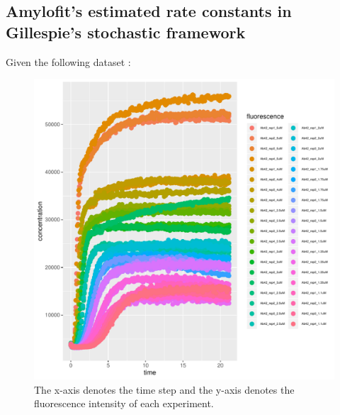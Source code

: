 \documentclass[11pt,a4paper]{article}
\begin{document}
\subsection{Amylofit's estimated rate constants in Gillespie's stochastic framework}
Given the following dataset :
  \begin{figure}[H]
  \centering
  \includegraphics[width=1\textwidth]{Images/normal.pdf}
  \caption{The x-axis denotes the time step and the y-axis denotes the fluorescence intensity of each experiment.}
  \label{fig: sample trajectory}
  \end{figure}
\end{document}
